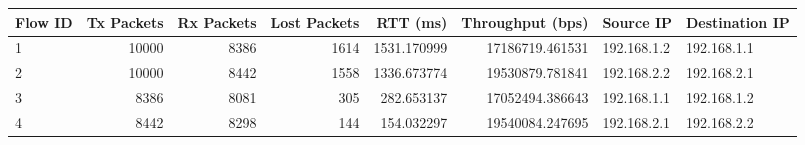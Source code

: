 \begin{tabular}{lrrrrrll}
\toprule
Flow ID & Tx Packets & Rx Packets & Lost Packets & RTT (ms) & Throughput (bps) & Source IP & Destination IP \\
\midrule
1 & 10000 & 8386 & 1614 & 1531.170999 & 17186719.461531 & 192.168.1.2 & 192.168.1.1 \\
2 & 10000 & 8442 & 1558 & 1336.673774 & 19530879.781841 & 192.168.2.2 & 192.168.2.1 \\
3 & 8386 & 8081 & 305 & 282.653137 & 17052494.386643 & 192.168.1.1 & 192.168.1.2 \\
4 & 8442 & 8298 & 144 & 154.032297 & 19540084.247695 & 192.168.2.1 & 192.168.2.2 \\
\bottomrule
\end{tabular}
